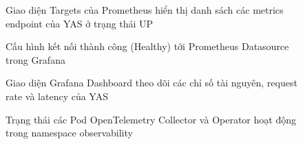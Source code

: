 \begin{figure}[H]
\centering
{}
\caption{Giao diện Targets của Prometheus hiển thị danh sách các metrics endpoint của YAS ở trạng thái UP}
\end{figure}

\begin{figure}[H]
\centering
{}
\caption{Cấu hình kết nối thành công (Healthy) tới Prometheus Datasource trong Grafana}
\end{figure}

\begin{figure}[H]
\centering
{}
\caption{Giao diện Grafana Dashboard theo dõi các chỉ số tài nguyên, request rate và latency của YAS}
\end{figure}

\begin{figure}[H]
\centering
{}
\caption{Trạng thái các Pod OpenTelemetry Collector và Operator hoạt động trong namespace observability}
\end{figure}
